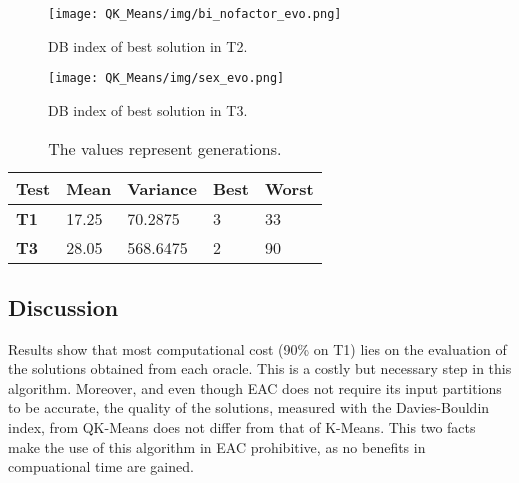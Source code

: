 \begin{figure}[hbtp]
\centering
\texttt{[image: QK\_Means/img/bi\_nofactor\_evo.png]}
\caption{DB index of best solution in T2.}
\label{fig:qk_db_index_best_evo_t2}
\end{figure}


\begin{figure}[hbtp]
\centering
\texttt{[image: QK\_Means/img/sex\_evo.png]}
\caption{DB index of best solution in T3.}
\label{fig:qk_db_index_best_evo_t3}
\end{figure}


\begin{table}[h]
\centering
\caption{The values represent generations.}



\begin{tabular}{lllll}

\toprule
\textbf{Test} & \textbf{Mean} & \textbf{Variance} & \textbf{Best} & \textbf{Worst} \\
\midrule

\textbf{T1}   & 17.25         & 70.2875           & 3             & 33             \\
\textbf{T3}   & 28.05         & 568.6475          & 2             & 90             \\ 
\bottomrule
\end{tabular}

\label{tab:db_index_t1_t3}
\end{table}




\subsection{Discussion}

Results show that most computational cost (90\% on T1) lies on the evaluation of the solutions obtained from each oracle. This is a costly but necessary step in this algorithm. Moreover, and even though EAC does not require its input partitions to be accurate, the quality of the solutions, measured with the Davies-Bouldin index, from QK-Means does not differ from that of K-Means. This two facts make the use of this algorithm in EAC prohibitive, as no benefits in compuational time are gained.

